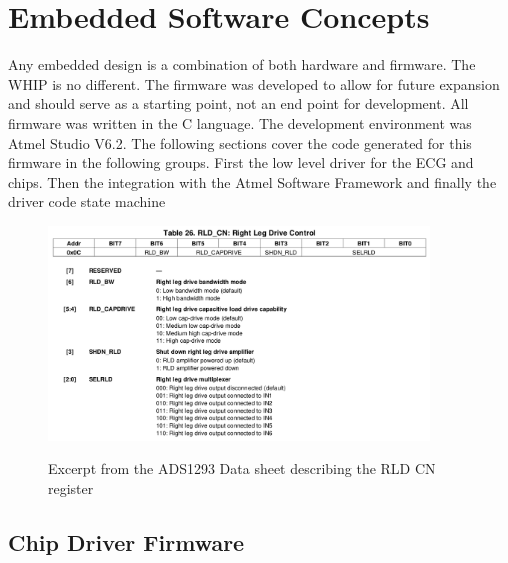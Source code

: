 \chapter{Embedded Software Concepts}
\label{chap:SensorConcepts}
Any embedded design is a combination of both hardware and firmware. The WHIP is no different. The firmware was developed to allow for future expansion and should serve as a starting point, not an end point for development. All firmware was written in the C language. The development environment was Atmel Studio V6.2. The following sections cover the code generated for this firmware in the following groups. First the low level driver for the ECG and  chips. Then the integration with the Atmel Software Framework and finally the driver code state machine

\begin{figure}
	\begin{center}
		\label{fig:ADS1293_RLD_CN}
		\includegraphics[scale=1,width=0.9\textwidth]{Images/ADS1293_RLD_CN.png} 
		\caption{Excerpt from the ADS1293 Data sheet describing the RLD CN register}
	\end{center}
\end{figure}

\section{Chip Driver Firmware}

